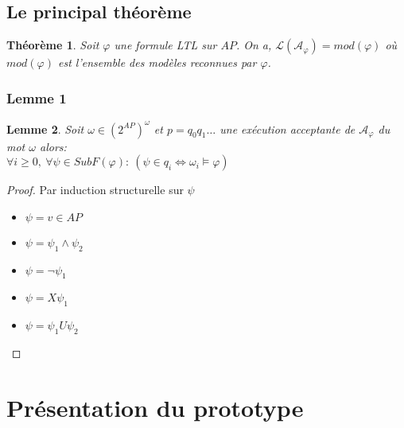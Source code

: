 \documentclass{beamer}
\theoremstyle{plain}
\newtheorem{thm}{Théorème}
\newtheorem{lem}[thm]{Lemme}
\theoremstyle{definition}
\begin{document}
\subsection{Le principal théorème}
\begin{frame}
  \begin{thm}
    Soit $\varphi$ une formule LTL sur $AP$. On a, $\mathcal{L}(\mathcal{A}_\varphi)=mod(\varphi)$ où $mod(\varphi)$ est l'ensemble des modèles reconnues par $\varphi$.
  \end{thm}
\end{frame}
\subsubsection{Lemme 1}
\begin{frame}
	\begin{lem}
		Soit $\omega \in (2^{AP})^\omega$ et $p=q_0q_1\dots$ une exécution acceptante de $\mathcal{A}_\varphi$ du mot $\omega$ alors: \\
		$\forall i \geq 0,\: \forall \psi \in SubF(\varphi): \: (\psi \in q_i \Leftrightarrow \omega_i \models \varphi)$
	\end{lem}
\end{frame}
\begin{frame}
	\begin{proof}
		Par induction structurelle sur $\psi$
		\pause
		\begin{itemize}
			\item $\psi = v \in AP$ \pause
			\item $\psi = \psi_1 \land \psi_2$ \pause
			\item $\psi = \lnot \psi_1$ \pause
			\item $\psi = X\psi_1$ \pause
			\item $\psi = \psi_1 U \psi_2$
		\end{itemize}
	\end{proof}
\end{frame}	



\section{Présentation du prototype}
\begin{frame}
  
\end{frame}
\end{document}
